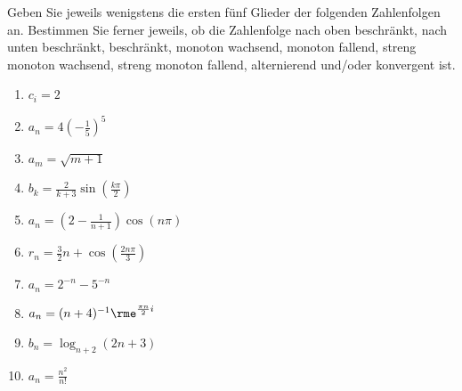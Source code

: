 Geben Sie jeweils wenigstens die ersten fünf Glieder der folgenden Zahlenfolgen an. Bestimmen Sie ferner jeweils, ob die Zahlenfolge nach oben beschränkt, nach unten beschränkt, beschränkt, monoton wachsend, monoton fallend, streng monoton wachsend, streng monoton fallend, alternierend und/oder konvergent ist.\\
\parbox{0.5\textwidth}{\begin{enumerate}
\item $c_i=2$
\item $a_n=4\left(-\frac{1}{5}\right)^5$
\item $a_m=\sqrt{m+1}$
\item $b_k=\frac{2}{k+3}\sin\left(\frac{k\pi}{2}\right)$
\item $a_n=\left(2-\frac{1}{n+1}\right)\cos(n\pi)$
\end{enumerate}}\parbox{0.5\textwidth}{\begin{enumerate}\setcounter{enumi}{5}
\item $r_n=\frac{3}{2}n+\cos\left(\frac{2 n \pi}{3}\right)$
\item $a_n=2^{-n}-5^{-n}$
\item $a_n=(n+4)^{-1}\rme^{\frac{\pi n}{2}i}$
\item $b_n=\log_{n+2}(2n+3)$ 
\item $a_n=\frac{n^2}{n!}$
\end{enumerate}}

\pagebreak


